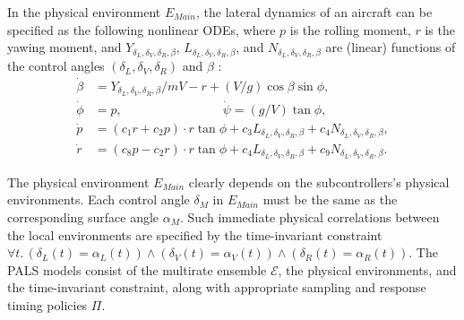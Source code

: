 In the physical environment $E_\mathit{Main}$,
the lateral dynamics of an aircraft
can be specified as the following nonlinear ODEs,
where $p$ is the rolling moment, $r$ is the yawing moment,
and $Y_{\delta_L,\delta_V,\delta_R,\beta}$, $L_{\delta_L,\delta_V,\delta_R,\beta}$, and $N_{\delta_L,\delta_V,\delta_R,\beta}$
are (linear) functions of the control angles $(\delta_L,\delta_V,\delta_R)$ 
and $\beta$
\cite{stevens2003aircraft}:
%
\begin{align*}
\dot{\beta} &= Y_{\delta_L,\delta_V,\delta_R,\beta} / m V - r + (V / g) \cos \beta \sin \phi,
\\
\dot{\phi} &= p,
\qquad\qquad\qquad\qquad
\dot{\psi} = (g / V) \tan \phi,
\\
\dot{p} &= (c_1 r + c_2 p) \cdot r  \tan \phi + c_3 L_{\delta_L,\delta_V,\delta_R,\beta} + c_4 N_{\delta_L,\delta_V,\delta_R,\beta},
\\
\dot{r} &= (c_8 p - c_2 r)  \cdot r  \tan \phi + c_4 L_{\delta_L,\delta_V,\delta_R,\beta} + c_9 N_{\delta_L,\delta_V,\delta_R,\beta}.
\end{align*}
%


The physical environment $E_\mathit{Main}$ clearly depends on the subcontrollers's physical environments.
Each control angle $\delta_M$ in  $E_\mathit{Main}$ must be the same as the corresponding surface angle $\alpha_M$.
Such  immediate physical correlations between the local environments are specified by the time-invariant constraint
%
$\forall t.\, (\delta_L(t) = \alpha_L(t)) \wedge (\delta_V(t) = \alpha_V(t)) \wedge (\delta_R(t) = \alpha_R(t))$.
%
The PALS models consist of the multirate ensemble $\mathcal{E}$, the physical environments, and the time-invariant constraint,
along with appropriate  sampling and response timing policies $\Pi$.


